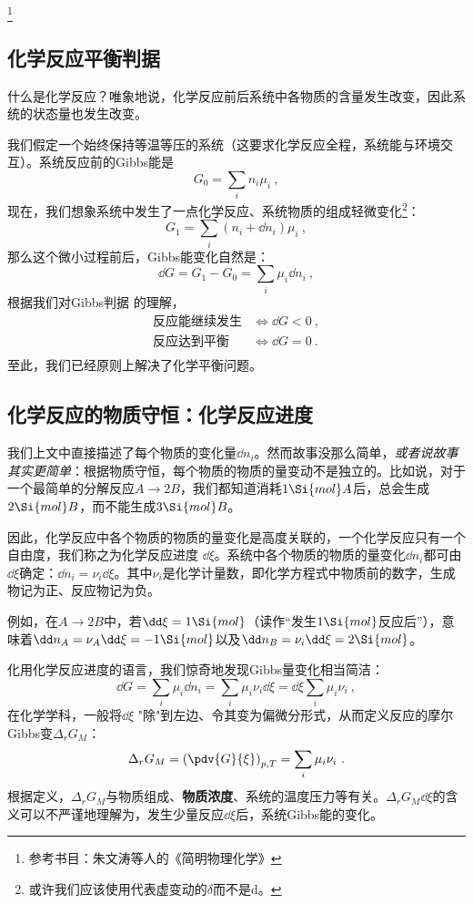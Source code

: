 
\begin{issues}
\issueDraft
\end{issues}

\footnote{参考书目：朱文涛等人的《简明物理化学》}
\subsection{化学反应平衡判据}
什么是化学反应？唯象地说，化学反应前后系统中各物质的含量发生改变，因此系统的状态量也发生改变。

我们假定一个始终保持等温等压的系统（这要求化学反应全程，系统能与环境交互）。系统反应前的Gibbs能是 
$$G_0 = \sum_i n_i \mu_i~,$$
现在，我们想象系统中发生了一点化学反应、系统物质的组成轻微变化\footnote{或许我们应该使用代表虚变动的$\delta$而不是$\mathrm{d}$。}：
$$G_1 = \sum_i (n_i + \dd n_i) \mu_i~,$$
那么这个微小过程前后，Gibbs能变化自然是：
$$\dd G = G_1 - G_0 = \sum_i \mu_i \dd n_i~,$$
根据我们对Gibbs判据  的理解，
$$
\begin{aligned}
\text{反应能继续发生} &\Longleftrightarrow \dd G < 0~,\\
\text{反应达到平衡} &\Longleftrightarrow \dd G = 0~.\\
\end{aligned}
$$
至此，我们已经原则上解决了化学平衡问题。

\subsection{化学反应的物质守恒：化学反应进度}
我们上文中直接描述了每个物质的变化量$\dd n_i$。然而故事没那么简单，\textsl{或者说故事其实更简单}：根据物质守恒，每个物质的物质的量变动不是独立的。比如说，对于一个最简单的分解反应$A\to2B$，我们都知道消耗$1 \Si{mol} A$后，总会生成$2 \Si{mol} B$，而不能生成$3 \Si{mol} B$。

因此，化学反应中各个物质的物质的量变化是高度关联的，一个化学反应只有一个自由度，我们称之为化学反应进度 $\dd \xi$。系统中各个物质的物质的量变化$\dd n_i$都可由$\dd \xi$确定：$\dd n_i = \nu_i \dd \xi$。其中$\nu_i$是化学计量数，即化学方程式中物质前的数字，生成物记为正、反应物记为负。

例如，在$A\to2B$中，若$\dd \xi=1 \Si{mol}$（读作“发生$1 \Si{mol}$反应后”），意味着$\dd n_A = \nu_A \dd \xi = - 1 \Si{mol}$以及$\dd n_B = \nu_i \dd \xi = 2 \Si{mol}$。

化用化学反应进度的语言，我们惊奇地发现Gibbs量变化相当简洁：
$$\dd G = \sum_i \mu_i \dd n_i = \sum_i \mu_i \nu_i \dd \xi =  \dd \xi \sum_i \mu_i \nu_i~,$$
在化学学科，一般将$\dd \xi$ "除"到左边、令其变为偏微分形式，从而定义反应的摩尔Gibbs变$\Delta_r G_M$：
$$\Delta_r G_M = \left(\pdv{G}{\xi}\right)_{p,T} = \sum_i \mu_i \nu_i~.$$
根据定义，$\Delta_r G_M$与物质组成、\textbf{物质浓度}、系统的温度压力等有关。$\Delta_r G_M \dd \xi$的含义可以不严谨地理解为，发生少量反应$\dd \xi$后，系统Gibbs能的变化。


